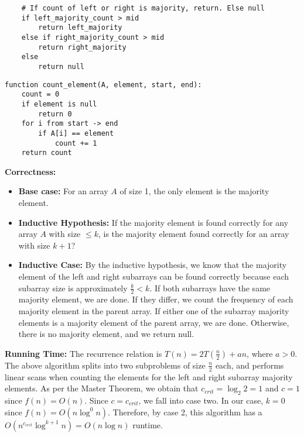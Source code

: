 \documentclass{article}
\begin{document}
\begin{enumerate}
\begin{enumerate}
\begin{multicols}{2}
\begin{verbatim}
    # If count of left or right is majority, return. Else null
    if left_majority_count > mid
        return left_majority
    else if right_majority_count > mid
        return right_majority
    else
        return null
            \end{verbatim}
            \columnbreak
            \begin{verbatim}
function count_element(A, element, start, end):
    count = 0    
    if element is null
        return 0
    for i from start -> end
        if A[i] == element
            count += 1
    return count
            \end{verbatim}
        \end{multicols}
            \textbf{Correctness:}
            \begin{itemize}
                \item \textbf{Base case:} For an array $A$ of size 1, the only element is the majority element.
                \item \textbf{Inductive Hypothesis:} If the majority element is found correctly for 
                    any array $A$ with size $\leq k$, is the majority element found correctly for an array
                    with size $k + 1$?
                \item \textbf{Inductive Case:} By the inductive hypothesis, we know that the majority element
                of the left and right subarrays can be found correctly because each subarray size is approximately
                $\frac{k}{2} < k$. If both subarrays have the same majority element, we are done. If they differ, 
                we count the frequency of each majority element in the parent array. If either one of the
                subarray majority elements is a majority element of the parent array, we are done. Otherwise,
                there is no majority element, and we return null.
            \end{itemize}
            
            \textbf{Running Time:} The recurrence relation is $T\left(n\right) = 2T\left(\frac{n}{2}\right) + an$,
            where $a > 0$. The above algorithm splits into two subproblems of size $\frac{n}{2}$ each, and
            performs linear scans when counting the elements for the left and right subarray majority
            elements. As per the Master Theorem, we obtain that $c_{crit} = \log_2 2 = 1$ and $c = 1$ since
            $f\left(n\right) = O\left(n\right)$. Since $c = c_{crit}$, we fall into case two. In our case, $k = 0$
            since $f\left(n\right) = O\left(n\log^0 n\right)$. Therefore, by case 2, this algorithm has a $O\left(n^{c_{crit}}\log^{k+1} n\right) = O\left(n\log n\right)$ runtime.
        

\end{enumerate}
\end{enumerate}
\end{document}
